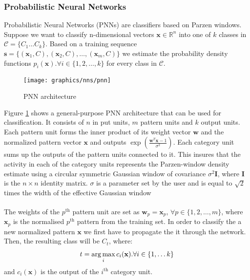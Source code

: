  	\subsubsection{Probabilistic Neural Networks}
 	Probabilistic Neural Networks (PNNs) are classifiers based on Parzen windows. Suppose we want to classify n-dimensional vectors $\mathbf{x} \in \mathbb{R}^n$ into one of $k$ classes in $\mathcal{C}=\{C_1\dots C_k\}$. Based on a training sequence $\mathbf{s} = \{ (\mathbf{x}_1, C), (\mathbf{x}_2, C), \dots ,(\mathbf{x}_m, C)\}$ we estimate the probability density functions $p_i(\mathbf{x}). \forall i \in \{1,2,\dots,k \}$ for every class in $\mathcal{C}$. 

  	\begin{figure}[H]
 		\centering
 		\texttt{[image: graphics/nns/pnn]}
 		\caption{PNN architecture}
 		\label{Fig 2.8}
 	\end{figure}
	 
	 Figure \ref{Fig 2.8} shows a general-purpose PNN architecture that can be used for classification. It consists of $n$ in put units, $m$ pattern units and $k$ output units. Each pattern unit forms the inner product of its weight vector $\mathbf{w}$ and the normalized pattern vector $\mathbf{x}$ and outputs $\exp(\frac{\mathbf{w}^T\mathbf{x} - 1}{\sigma^2})$. Each category unit sums up the outputs of the pattern units connected to it. This insures that the activity in each of the category units represents the Parzen-window density estimate using a circular symmetric Gaussian window of covariance $\sigma^2\mathbf{I}$, where $\mathbf{I}$ is the $n\times n$ identity matrix. $\sigma$ is a parameter set by the user and is equal to $\sqrt{2}$ times the width of the effective Gaussian window
     \\ \\ 
	 The weights of the $p^\text{th}$ pattern unit are set as $\mathbf{w}_p = \mathbf{x}_p$, $\forall p \in \{ 1,2,\dots ,m \}$, where $\mathbf{x}_p$ is the normalised $p^\text{th}$ pattern from the training set. In order to classify the a new normalized pattern $\mathbf{x}$ we first have to propagate the it through the network. Then, the resulting class will be $C_t$, where:
	 \begin{equation}
		 t = \operatorname*{arg\,max}_i c_i(\mathbf{x}). \forall i \in \{1,\dots k\}
	 \end{equation}
	 and $c_i(\mathbf{x})$ is the output of the $i^\text{th}$ category unit.
